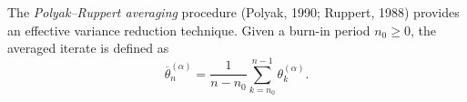 The \emph{Polyak--Ruppert averaging} procedure (Polyak, 1990; Ruppert, 1988)
provides an effective variance reduction technique. Given a burn-in period
$n_0\geq 0$, the averaged iterate is defined as
\begin{equation}
  \overline{\theta}_n^{(\alpha)}
  = \frac{1}{n-n_0}\sum_{k=n_0}^{n-1}\theta_k^{(\alpha)}.
  \label{eq:pr-average}
\end{equation}

